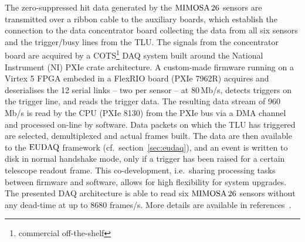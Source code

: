 The zero-suppressed hit data generated by the $\textrm{MIMOSA\,26}$ sensors are transmitted over a ribbon cable to the auxiliary boards,
 which establish the connection to the data concentrator board collecting the data from all six sensors and the trigger/busy lines from the TLU.
The signals from the concentrator board are acquired by a COTS\footnote{commercial off-the-shelf} DAQ system built around the National Instrument (NI) PXIe crate architecture. 
A custom-made firmware running on a Virtex 5 FPGA embeded in a FlexRIO board (PXIe 7962R) acquires and deserialises the 12 serial links -- two per sensor -- at 80\,Mb/s,
 detects triggers on the trigger line, and reads the trigger data. 
The resulting data stream of 960 Mb/s is read by the CPU (PXIe 8130) from the PXIe bus via a DMA channel and processed on-line by software. 
Data packets on which the TLU has triggered are selected, demultiplexed and actual frames built. 
The data are then available to the $\textrm{EUDAQ}$ framework (cf.\ section~\ref{sec:eudaq}), and an event is written to disk in normal handshake mode, only if a trigger has been raised for a certain telescope readout frame. 
This co-development, i.e.\ sharing processing tasks between firmware and software, allows for high flexibility for system upgrades. 
The presented DAQ architecture is able to read six $\textrm{MIMOSA\,26}$ sensors without any dead-time at up to 8680 frames/s.
More details are available in references~\cite{EUDET-2010-25,Claus}.
 
 
